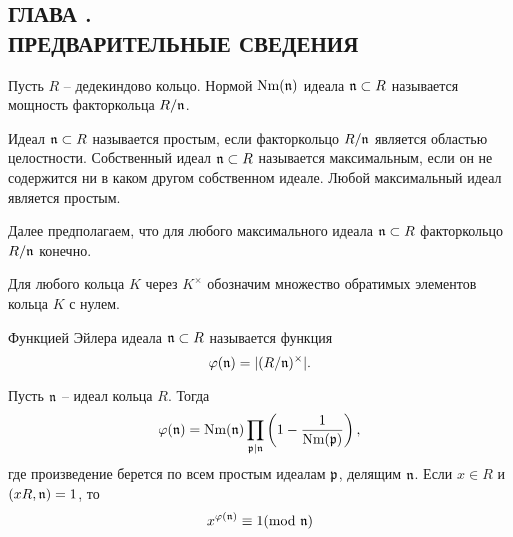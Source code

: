 \documentclass[_dissertation.tex]{subfiles}
\begin{document}
\onlyinsubfile{
    \renewcommand{\contentsname}{ОГЛАВЛЕНИЕ}
    \setcounter{tocdepth}{3}
    \tableofcontents
}

\newpage
\begin{center}
    \section*{ГЛАВА .\\ ПРЕДВАРИТЕЛЬНЫЕ СВЕДЕНИЯ}\label{ch:Prelimiaries}
\end{center}

Пусть $R$ -- дедекиндово кольцо.
Нормой $\textrm{Nm}(\mathfrak{n})$ идеала $\mathfrak{n} \subset R$ называется мощность факторкольца $R/\mathfrak{n}$.

Идеал $\mathfrak{n} \subset R$ называется простым, если факторкольцо $R/\mathfrak{n}$ является областью целостности.
Собственный идеал $\mathfrak{n} \subset R$ называется максимальным, если он не содержится ни в каком другом собственном идеале.
Любой максимальный идеал является простым.

Далее предполагаем, что для любого  максимального идеала $\mathfrak{n} \subset R$ факторкольцо $R/\mathfrak{n}$ конечно.

\begin{definition}
    Для любого кольца $K$ через $K^{\times}$ обозначим множество обратимых элементов кольца $K$ с нулем.
\end{definition}

\begin{definition}
    Функцией Эйлера идеала $\mathfrak{n} \subset R$ называется функция
    \begin{equation*}
        \varphi(\mathfrak{n}) = |(R/\mathfrak{n})^{\times}|.
    \end{equation*}
\end{definition}

\begin{statement}\cite{Narkiewicz}\label{statement:euler_function}
    Пусть $\mathfrak{n}$ -- идеал кольца $R$.
    Тогда
    \begin{equation*}
        \varphi(\mathfrak{n}) = \textrm{Nm}(\mathfrak{n}) \prod_{\mathfrak{p} | \mathfrak{n}} \left(
            1 - \frac{1}{\textrm{Nm}(\mathfrak{p})}
        \right),
    \end{equation*}
    где произведение берется по всем простым идеалам $\mathfrak{p}$, делящим $\mathfrak{n}$.
    Если $x \in R$ и $(xR, \mathfrak{n}) = 1$, то
    \begin{equation*}
        x^{\varphi(\mathfrak{n})} \equiv 1 (\textrm{mod } \mathfrak{n})
    \end{equation*}
\end{statement}
\end{document}
